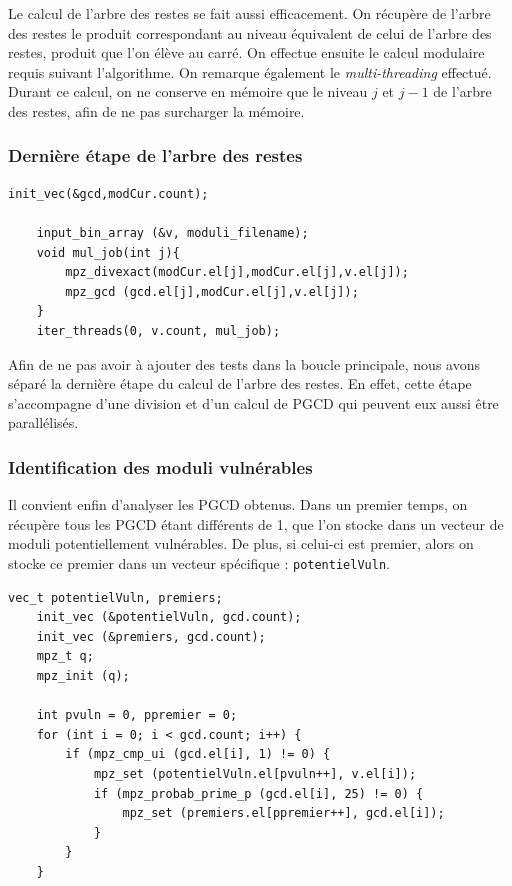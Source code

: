 Le calcul de l'arbre des restes se fait aussi efficacement. On récupère de l'arbre des restes le produit correspondant au niveau équivalent de celui de l'arbre des restes, produit que l'on élève au carré. On effectue ensuite le calcul modulaire requis suivant l'algorithme. On remarque également le \textit{multi-threading} effectué. Durant ce calcul, on ne conserve en mémoire que le niveau $j$ et $j-1$ de l'arbre des restes, afin de ne pas surcharger la mémoire. \\



\subsubsection{Dernière étape de l'arbre des restes}

\begin{lstlisting}[style=customc,caption=fact\_superspeed.c - partie 4, label=fact4]
init_vec(&gcd,modCur.count);
	
	input_bin_array (&v, moduli_filename);
	void mul_job(int j){
		mpz_divexact(modCur.el[j],modCur.el[j],v.el[j]); 
		mpz_gcd (gcd.el[j],modCur.el[j],v.el[j]); 
	}
	iter_threads(0, v.count, mul_job);
\end{lstlisting}

Afin de ne pas avoir à ajouter des tests dans la boucle principale, nous avons séparé la dernière étape du calcul de l'arbre des restes. En effet, cette étape s'accompagne d'une division et d'un calcul de PGCD qui peuvent eux aussi être parallélisés. \\





\subsubsection{Identification des moduli vulnérables}
Il convient enfin d'analyser les PGCD obtenus. Dans un premier temps, on récupère tous les PGCD étant différents de 1, que l'on stocke dans un vecteur de moduli potentiellement vulnérables. De plus, si celui-ci est premier, alors on stocke ce premier dans un vecteur spécifique : \verb+potentielVuln+. 

\begin{lstlisting}[style=customc,caption=fact\_superspeed.c - partie 5a, label=fact5]
	vec_t potentielVuln, premiers;
	init_vec (&potentielVuln, gcd.count);
	init_vec (&premiers, gcd.count);
	mpz_t q;
	mpz_init (q);
	
	int pvuln = 0, ppremier = 0;
	for (int i = 0; i < gcd.count; i++) {
		if (mpz_cmp_ui (gcd.el[i], 1) != 0) {
			mpz_set (potentielVuln.el[pvuln++], v.el[i]);
			if (mpz_probab_prime_p (gcd.el[i], 25) != 0) {
				mpz_set (premiers.el[ppremier++], gcd.el[i]);
			}
		}
	}
\end{lstlisting}



